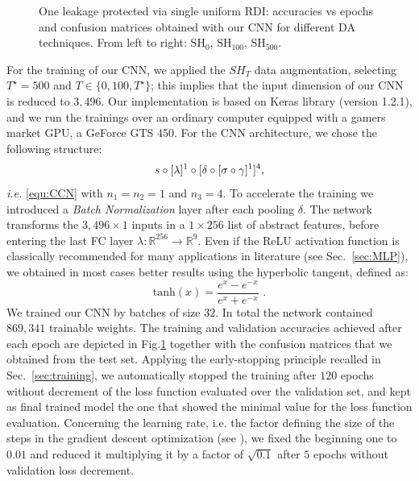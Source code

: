 \begin{figure}[t]
\caption{One leakage protected via single uniform RDI: accuracies vs epochs and confusion matrices obtained with our CNN for different DA techniques. From left to right: $\mathrm{SH}_0$, $\mathrm{SH}_{100}$, $\mathrm{SH}_{500}$. }\label{fig:CW_shift_history}
\end{figure}

For the training of our CNN, we applied the $SH_T$ data augmentation, selecting $T^\star = 500$ and $T \in \{ 0,100, T^\star\}$; this implies that the input dimension of our CNN is reduced to $3,496$. Our implementation is based on Keras library \cite{keras} (version 1.2.1), and we run the trainings over an ordinary computer equipped with a gamers market GPU, a GeForce GTS 450. For the CNN architecture, we chose the following structure: 
\begin{equation}\label{eq:archi}
  s \circ [\lambda]^1 \circ[\delta \circ [\sigma \circ \gamma  ]^1 ]^4,   
\end{equation}
\emph{i.e.} \eqref{equ:CCN} with $n_1 = n_2 = 1$ and $n_3 = 4$.
To accelerate the training we introduced a \emph{Batch Normalization} layer \cite{batch_norm} after each pooling $\delta$. The network transforms the $3,496 \times 1$ inputs in a $1 \times 256$ list of abstract features, before entering the last FC layer $\lambda:\mathbb{R}^{256}\rightarrow \mathbb{R}^9$. Even if the ReLU activation function \cite{nair2010rectified} is classically recommended for many applications in literature (see Sec.~\ref{sec:MLP}), we obtained in most cases better results using the hyperbolic tangent, defined as:
\begin{equation}
\mathrm{tanh}(x) = \frac{e^x-e^{-x}}{e^x+e^{-x}} \mbox{ .}
\end{equation}
We trained our CNN by batches of size $32$.  In total the network contained $869,341$ trainable weights. The training and validation accuracies achieved after each epoch are depicted in Fig.\ref{fig:CW_shift_history} together with the confusion matrices that we obtained from the test set. Applying the early-stopping principle recalled in Sec.~\ref{sec:training},  we automatically stopped the training after $120$ epochs without decrement of the loss function evaluated over the validation set, and kept as final trained model the one that showed the minimal value for the loss function evaluation. Concerning the learning rate, i.e. the factor defining the size of the steps in the gradient descent optimization (see \cite{Goodfellow-et-al-2016}), we fixed the beginning one to $0.01$ and reduced it multiplying it by a factor of $\sqrt{0.1}$ after $5$ epochs without validation loss decrement.


